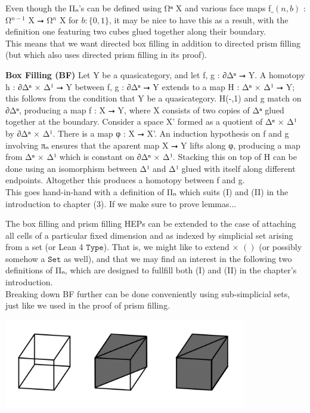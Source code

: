 \documentclass{book}
\theoremstyle{definition}
\begin{document}
Even though the Π⃗ₙ's can be defined using Ω⃗ⁿ X and various face maps f$\_(n,b)$ : Ω⃗${}^{n-1}$ X ⭢ Ω⃗${}^{n}$ X for $b : \{ 0, 1 \}$, it may be nice to have this as a result, with the definition one featuring two cubes glued together along their boundary.\\

This means that we want directed box filling in addition to directed prism filling (but which also uses directed prism filling in its proof).

{\bf Box Filling (BF)} Let Y be a quasicategory, and let f, g : ∂Δⁿ ⭢ Y. A homotopy h : ∂Δⁿ × Δ¹ ⭢ Y between f, g : ∂Δⁿ ⭢ Y extends to a map H : Δⁿ × Δ¹ ⭢ Y; this follows from the condition that Y be a quasicategory. H(-,1) and g match on ∂Δⁿ, producing a map f : X ⭢ Y, where X consists of two copies of Δⁿ glued together at the boundary. Consider a space X' formed as a quotient of Δⁿ × Δ¹ by ∂Δⁿ × Δ¹. There is a map φ : X ⭢ X'. An induction hypothesis on f and g involving πₙ ensures that the aparent map X ⭢ Y lifts along φ, producing a map from Δⁿ × Δ¹ which is constant on ∂Δⁿ × Δ¹. Stacking this on top of H can be done using an isomorphism between Δ¹ and Δ¹ glued with itself along different endpoints. Altogether this produces a homotopy between f and g.\\

This goes hand-in-hand with a definition of Π⃗ₙ which suits (I) and (II) in the introduction to chapter (3). If we make sure to prove lemmas... 

The box filling and prism filling HEPs can be extended to the case of attaching all cells of a particular fixed dimension and as indexed by simplicial set arising from a set (or Lean 4 $\texttt{Type}$). That is, we might like to extend × $()$ (or possibly somehow a $\texttt{Set}$ as well), and that we may find an interest in the following two definitions of Π⃗ₙ, which are designed to fullfill both (I) and (II) in the chapter's introduction.\\

Breaking down BF further can be done conveniently using sub-simplicial sets, just like we used in the proof of prism filling. 

\begin{center}
\includegraphics[width=300pt]{boxfilling.png}
\end{center}
\end{document}
